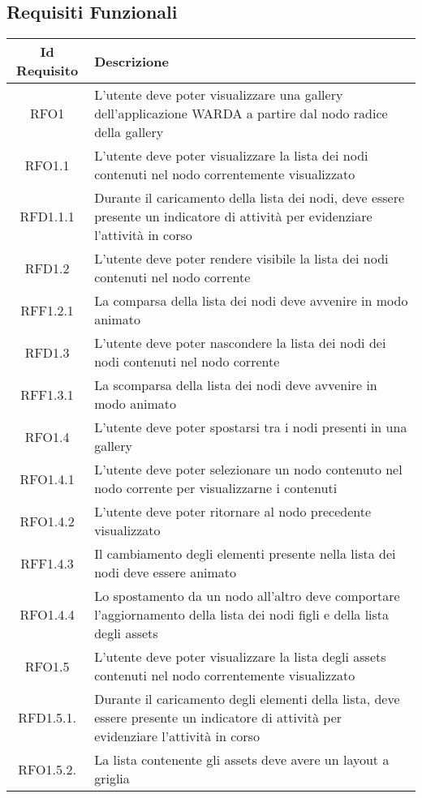 \subsection{Requisiti Funzionali}
\normalsize
\begin{longtable}{|c|m{10cm}|}
\hline
\textbf{Id Requisito} & \textbf{Descrizione}\\
\hline
\endhead
RFO1 & L'utente deve poter visualizzare una gallery dell'applicazione WARDA a partire dal nodo radice della gallery \\ \hline
RFO1.1 & L'utente deve poter visualizzare la lista dei nodi contenuti nel nodo correntemente visualizzato \\ \hline
RFD1.1.1 & Durante il caricamento della lista dei nodi, deve essere presente un indicatore di attività per evidenziare l'attività in corso \\ \hline
RFD1.2 & L'utente deve poter rendere visibile la lista dei nodi contenuti nel nodo corrente \\ \hline
RFF1.2.1 & La comparsa della lista dei nodi deve avvenire in modo animato \\ \hline
RFD1.3 & L'utente deve poter nascondere la lista dei nodi dei nodi contenuti nel nodo corrente \\ \hline
RFF1.3.1 & La scomparsa della lista dei nodi deve avvenire in modo animato \\ \hline
RFO1.4 & L'utente deve poter spostarsi tra i nodi presenti in una gallery \\ \hline
RFO1.4.1 & L'utente deve poter selezionare un nodo contenuto nel nodo corrente per visualizzarne i contenuti \\ \hline
RFO1.4.2 & L'utente deve poter ritornare al nodo precedente visualizzato \\ \hline
RFF1.4.3 & Il cambiamento degli elementi presente nella lista dei nodi deve essere animato \\ \hline
RFO1.4.4 & Lo spostamento da un nodo all'altro deve comportare l'aggiornamento della lista dei nodi figli e della lista degli assets \\ \hline
RFO1.5 & L'utente deve poter visualizzare la lista degli assets contenuti nel nodo correntemente visualizzato \\ \hline
RFD1.5.1. & Durante il caricamento degli elementi della lista, deve essere presente un indicatore di attività per evidenziare l'attività in corso \\ \hline
RFO1.5.2. & La lista contenente gli assets deve avere un layout a griglia \\ \hline

\end{longtable}
